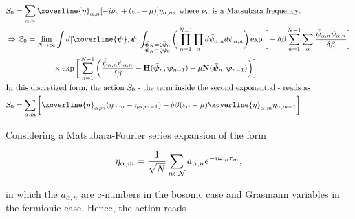 \documentclass{homework}
\begin{document}
\begin{equation}
    \begin{split}
        &S_0 = \sum_{\alpha, n} \xoverline{\eta}_{\alpha, n} [-i \nu_n + (\epsilon_{\alpha} - \mu)] \eta_{\alpha, n}, \textnormal{ where $\nu_n$ is a Matsubara frequency}. \\
        &\Rightarrow \mathcal{Z}_0 = \lim_{N \rightarrow \infty} \int d[\xoverline{\bm{{\psi}}}, \bm{\psi}] \int_{\substack{
            \bar{\bm{\psi}}_N = \zeta \bar{\bm{\psi}}_0 
            \\
            {\bm{\psi}}_N = \zeta {\bm{\psi}}_0 
        }} \bigg(
                \prod_{n=1}^{N=1} \prod_{\alpha}        d\bar{\psi}_{\alpha, n} d{\psi}_{\alpha, n}
            \bigg) 
            \exp \bigg[-\delta \beta \sum_{n=1}^{N-1} \sum_{\alpha} 
                \frac{\bar{\psi}_{\alpha, n} {\psi}_{\alpha, n}}{\delta \beta}
            \bigg] \\
            & \qquad \qquad \qquad \times \exp \bigg[
                \sum_{n=1}^{N-1}
                \bigg(
                    \frac{\bar{\psi}_{\alpha, n} {\psi}_{\alpha, n}}{\delta \beta} - {\bf H}(\bar{\bm{\psi}}_{n}, \bm{\psi}_{n-1}) + \mu {\bf N} (\bm{\bar{\psi}}_{n}, \bm{\psi}_{n-1})
                \bigg)
            \bigg] \\
        & \textnormal{In this discretized form, the action $S_0$ - the term inside the second exponential - reads as } \\
        &S_0 =  \sum_{\alpha, m} \bigg[             
                        \xoverline{\eta}_{\alpha, m}            (\eta_{\alpha, m} - \eta_{\alpha, m-1} ) - \delta \beta (\varepsilon_{\alpha} - \mu) 
                        \xoverline{\eta}_{\alpha, m} \eta_{\alpha, m-1}
        \bigg] \\
    \end{split}
\end{equation}

Considering a Matsubara-Fourier series expansion of the form

\[
    \eta_{\alpha, m} = \frac{1}{\sqrt{N}} \sum_{n \in \mathcal{N}} a_{\alpha,n} e^{-i\omega_m \tau_m},
\]

in which the $a_{\alpha, n}$ are c-numbers in the bosonic case and Grasmann variables in the fermionic case. 
Hence, the action reads 
\end{document}
